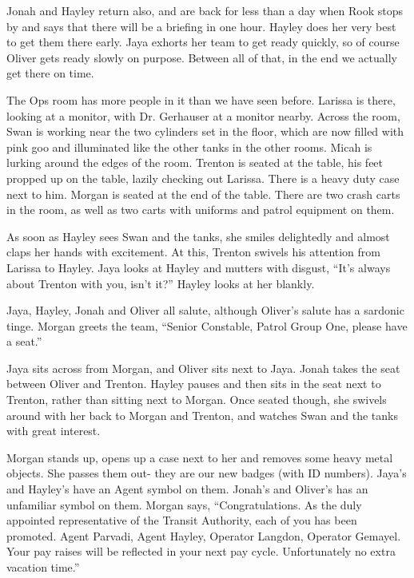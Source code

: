 Jonah and Hayley return also, and are back for less than a day when Rook stops by and says that there will be a briefing in one hour.  Hayley does her very best to get them there early.   Jaya exhorts her team to get ready quickly, so of course Oliver gets ready slowly on purpose.   Between all of that, in the end we actually get there on time.



The Ops room has more people in it than we have seen before.  Larissa is there, looking at a monitor, with Dr. Gerhauser at a monitor nearby.  Across the room, Swan is working near the two cylinders set in the floor, which are now filled with pink goo and illuminated like the other tanks in the other rooms.  Micah is lurking around the edges of the room.  Trenton is seated at the table, his feet propped up on the table, lazily checking out Larissa.  There is a heavy duty case next to him.  Morgan is seated at the end of the table.  There are two crash carts in the room, as well as two carts with uniforms and patrol equipment on them.



As soon as Hayley sees Swan and the tanks, she smiles delightedly and almost claps her hands with excitement.  At this, Trenton swivels his attention from Larissa to Hayley.  Jaya looks at Hayley and mutters with disgust, ``It's always about Trenton with you, isn't it?''  Hayley looks at her blankly.



Jaya, Hayley, Jonah and Oliver all salute, although Oliver's salute has a sardonic tinge.  Morgan greets the team, ``Senior Constable, Patrol Group One, please have a seat.''



Jaya sits across from Morgan, and Oliver sits next to Jaya.  Jonah takes the seat between Oliver and Trenton.  Hayley pauses and then sits in the seat next to Trenton, rather than sitting next to Morgan.  Once seated though, she swivels around with her back to Morgan and Trenton, and watches Swan and the tanks with great interest.



Morgan stands up, opens up a case next to her and removes some heavy metal objects.  She passes them out- they are our new badges (with ID numbers).  Jaya's and Hayley's have an Agent symbol on them.  Jonah's and Oliver's has an unfamiliar symbol on them.  Morgan says, ``Congratulations. As the duly appointed representative of the Transit Authority, each of you has been promoted.  Agent Parvadi, Agent Hayley, Operator Langdon, Operator Gemayel.  Your pay raises will be reflected in your next pay cycle.  Unfortunately no extra vacation time.''



